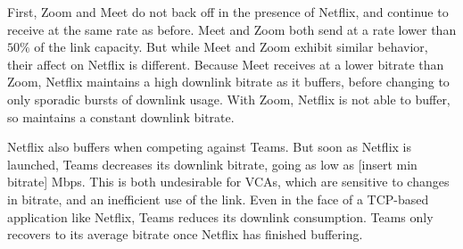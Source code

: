 First, Zoom and Meet do not back off in the presence of Netflix, and continue to receive at the same rate as before. Meet and Zoom both send at a rate lower than $50\%$ of the link capacity. But while Meet and Zoom exhibit similar behavior, their affect on Netflix is different. Because Meet receives at a lower bitrate than Zoom, Netflix maintains a high downlink bitrate as it buffers, before changing to only sporadic bursts of downlink usage. With Zoom, Netflix is not able to buffer, so maintains a constant downlink bitrate. 

Netflix also buffers when competing against Teams. But soon as Netflix is launched, Teams decreases its downlink bitrate, going as low as [insert min bitrate] Mbps. This is both undesirable for VCAs, which are sensitive to changes in bitrate, and an inefficient use of the link. Even in the face of a TCP-based application like Netflix, Teams reduces its downlink consumption. Teams only recovers to its average bitrate once Netflix has finished buffering. 








